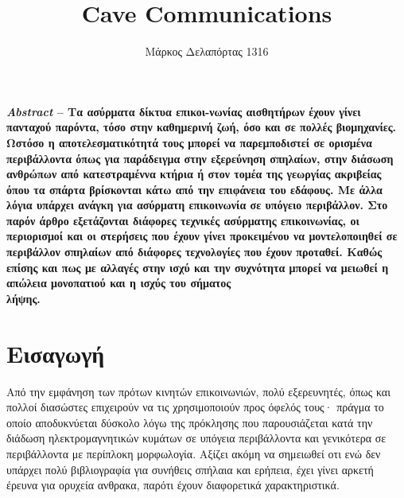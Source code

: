 \documentclass[12pt]{article}
\title{\textsf{Cave Communications}}
\author{\textsf{Μάρκος Δελαπόρτας 1316}}
\date{}
\begin{document}
\maketitle

\begin{multicols}{2}
    \scriptsize \textbf{
        \textit{Abstract} -- Τα ασύρματα
        δίκτυα επικοι-νωνίας αισθητήρων έχουν γίνει πανταχού
        παρόντα, τόσο στην καθημερινή ζωή, όσο και σε πολλές
        βιομηχανίες. Ωστόσο η αποτελεσματικότητά τους μπορεί
        να παρεμποδιστεί σε ορισμένα περιβάλλοντα όπως για
        παράδειγμα στην εξερεύνηση σπηλαίων, στην διάσωση
        ανθρώπων από κατεστραμέννα κτήρια ή στον τομέα της
        γεωργίας ακριβείας όπου τα σπάρτα βρίσκονται κάτω
        από την επιφάνεια του εδάφους. Με άλλα λόγια υπάρχει
        ανάγκη για ασύρματη επικοινωνία σε υπόγειο
        περιβάλλον. Στο παρόν άρθρο εξετάζονται διάφορες
        τεχνικές ασύρματης επικοινωνίας, οι περιορισμοί και
        οι στερήσεις που έχουν γίνει προκειμένου να
        μοντελοποιηθεί σε περιβάλλον σπηλαίων από διάφορες
        τεχνολογίες που έχουν προταθεί. Καθώς επίσης και πως
        με αλλαγές στην ισχύ και την συχνότητα μπορεί να
        μειωθεί η απώλεια μονοπατιού και η ισχύς του σήματος\\
        λήψης. 
    }

    \section{\normalsize \textsf{Εισαγωγή}} %
        Από την εμφάνηση των πρότων κινητών επικοινωνιών,
        πολύ εξερευνητές, όπως και πολλοί διασώστες
        επιχειρούν να τις χρησιμοποιούν προς όφελός τους·
        πράγμα το οποίο αποδυκνύεται δύσκολο λόγω της
        πρόκλησης που παρουσιάζεται κατά την διάδωση
        ηλεκτρομαγνητικών κυμάτων σε υπόγεια περιβάλλοντα
        και γενικότερα σε περιβάλλοντα με περίπλοκη
        μορφωλογία. Αξίζει ακόμη να σημειωθεί οτι ενώ δεν
        υπάρχει πολύ βιβλιογραφία για συνήθεις σπήλαια και
        ερήπεια, έχει γίνει αρκετή έρευνα για ορυχεία
        ανθρακα, παρότι έχουν διαφορετικά χαρακτηριστικά.
    

\end{multicols}
\end{document}
